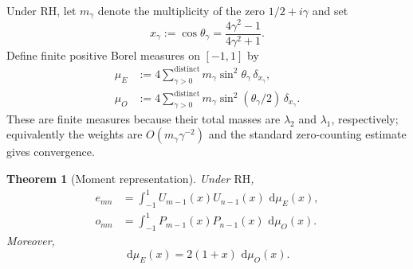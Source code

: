 \documentclass[11pt]{amsart}
\numberwithin{equation}{section}
\theoremstyle{plain}
\newtheorem{theorem}{Theorem}[section]
\theoremstyle{definition}
\theoremstyle{remark}
\newcommand{\RH}{\mathrm{RH}}
\newcommand{\dd}{\,\mathrm d}
\begin{document}
Under $\RH$, let $m_\gamma$ denote the multiplicity of the zero $1/2+i\gamma$ and set
\begin{equation}
x_\gamma:=\cos\theta_\gamma
=\frac{4\gamma^2-1}{4\gamma^2+1}.
\label{eq:x_gamma}
\end{equation}
Define finite positive Borel measures on $[-1,1]$ by
\begin{align}
\mu_E
&:=4\sum_{\gamma>0}^{\mathrm{distinct}}m_\gamma\sin^2\theta_\gamma\,\delta_{x_\gamma},
\label{eq:mu_E}\\
\mu_O
&:=4\sum_{\gamma>0}^{\mathrm{distinct}}m_\gamma\sin^2(\theta_\gamma/2)\,\delta_{x_\gamma}.
\label{eq:mu_O}
\end{align}
These are finite measures because their total masses are $\lambda_2$ and $\lambda_1$, respectively; equivalently the weights are $O(m_\gamma\gamma^{-2})$ and the standard zero-counting estimate gives convergence.

\begin{theorem}[Moment representation]
\label{thm:moment_representation}
Under $\RH$,
\begin{align}
e_{mn}
&=\int_{-1}^{1}U_{m-1}(x)U_{n-1}(x)\,\dd\mu_E(x),
\label{eq:E_moment_representation}\\
o_{mn}
&=\int_{-1}^{1}P_{m-1}(x)P_{n-1}(x)\,\dd\mu_O(x).
\label{eq:O_moment_representation}
\end{align}
Moreover,
\begin{equation}
\dd\mu_E(x)=2(1+x)\,\dd\mu_O(x).
\label{eq:christoffel_measure_relation}
\end{equation}
\end{theorem}
\end{document}
